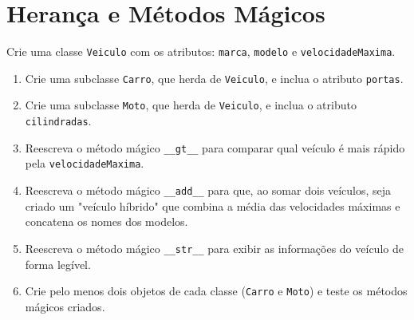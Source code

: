 \documentclass{article}
\begin{document}
\section{Herança e Métodos Mágicos}

Crie uma classe \texttt{Veiculo} com os atributos: \texttt{marca}, \texttt{modelo} e \texttt{velocidadeMaxima}.  

\begin{enumerate}
    \item Crie uma subclasse \texttt{Carro}, que herda de \texttt{Veiculo}, e inclua o atributo \texttt{portas}.  
    \item Crie uma subclasse \texttt{Moto}, que herda de \texttt{Veiculo}, e inclua o atributo \texttt{cilindradas}.  
    \item Reescreva o método mágico \texttt{\_\_gt\_\_} para comparar qual veículo é mais rápido pela \texttt{velocidadeMaxima}.  
    \item Reescreva o método mágico \texttt{\_\_add\_\_} para que, ao somar dois veículos, seja criado um "veículo híbrido" que combina a média das velocidades máximas e concatena os nomes dos modelos.  
    \item Reescreva o método mágico \texttt{\_\_str\_\_} para exibir as informações do veículo de forma legível.  
    \item Crie pelo menos dois objetos de cada classe (\texttt{Carro} e \texttt{Moto}) e teste os métodos mágicos criados.  
\end{enumerate}
\end{document}
